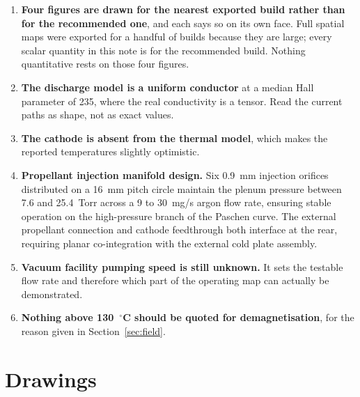 \documentclass[11pt,a4paper]{article}
\newcommand{\degC}{$^\circ$C}
\begin{document}
\begin{enumerate}[itemsep=4pt]
        What this costs is smaller than it sounds. Both inputs are solved
        exactly for this geometry: the field by the magnetostatic sweep and the
        temperatures by the thermal sweep. What is missing is letting the
        remanence read the local temperature point by point instead of applying
        one scale factor, and Section~\ref{sec:verif} measures that difference
        across thirteen coupled cases and finds it conservative by up to 1.4\%.
        \textbf{The fix is one more coupled case and about thirty minutes of
        solver time}, and it should be run before the magnets are ordered.
  \item \textbf{Four figures are drawn for the nearest exported build rather
        than for the recommended one}, and each says so on its own face. Full
        spatial maps were exported for a handful of builds because they are
        large; every scalar quantity in this note is for the recommended build.
        Nothing quantitative rests on those four figures.
  \item \textbf{The discharge model is a uniform conductor} at a median Hall
        parameter of 235, where the real conductivity is a tensor. Read the current paths
        as shape, not as exact values.
  \item \textbf{The cathode is absent from the thermal model}, which makes the
        reported temperatures slightly optimistic.
  \item \textbf{Propellant injection manifold design.} Six 0.9~mm injection
        orifices distributed on a 16~mm pitch circle maintain the plenum pressure
        between 7.6 and 25.4~Torr across a 9 to 30~mg/s argon flow rate, ensuring
        stable operation on the high-pressure branch of the Paschen curve. The
        external propellant connection and cathode feedthrough both interface at
        the rear, requiring planar co-integration with the external cold plate
        assembly.
  \item \textbf{Vacuum facility pumping speed is still unknown.} It sets the
        testable flow rate and therefore which part of the operating map can
        actually be demonstrated.
  \item \textbf{Nothing above 130~\degC{} should be quoted for demagnetisation},
        for the reason given in Section~\ref{sec:field}.
\end{enumerate}

\section{Drawings}
\label{sec:drawings}
\end{document}
